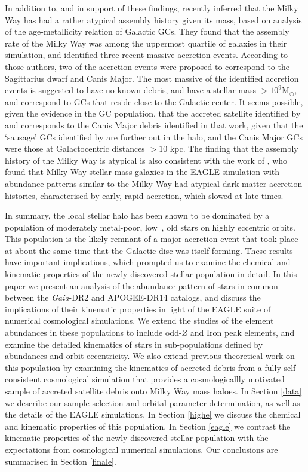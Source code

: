 In addition to, and in support of these findings,
\citet{2018MNRAS.tmp.1537K} recently inferred that the Milky Way
has had a rather atypical assembly history given its mass, based on analysis of 
the age-metallicity relation of Galactic GCs. They found that the
assembly rate of the Milky Way was among the uppermost quartile of
galaxies in their simulation, and identified three recent massive accretion events. According to those authors, two of the accretion events were proposed to correspond to the Sagittarius
dwarf and  Canis Major. The most
massive of the identified accretion events is suggested to have no
known debris, and have a stellar mass $> 10^9 \mathrm{M_\odot}$,
and correspond to GCs that reside close to the Galactic center. It
seems possible, given the evidence in the GC population, that the
accreted satellite identified by \citet{2018MNRAS.478..611B} and
\citet{2018ApJ...860L..11K} corresponds to the Canis Major debris
identified in that work, given that the `sausage' GCs identified
by \citet{2018arXiv180500453M} are further out in the halo, and the
Canis Major GCs were those at Galactocentric distances $> 10$ kpc.
The finding that the assembly history of the Milky Way is atypical
is also consistent with the work of \citet{2018MNRAS.477.5072M},
who found that Milky Way stellar mass galaxies in the EAGLE simulation
with \afe{} abundance patterns similar to the Milky Way had atypical
dark matter accretion histories, characterised by early, rapid
accretion, which slowed at late times.

In summary, the local stellar halo has been shown to be dominated
by a population of moderately metal-poor, low~\afe{}, old stars on
highly eccentric orbits.  This population is the likely remnant of
a major accretion event that took place at about the same time that
the Galactic disc was itself forming.  These results have important
implications, which prompted us to examine the chemical and kinematic
properties of the newly discovered stellar population in detail.
In this paper we present an analysis of the
 abundance pattern of stars in common between the \emph{Gaia}-DR2
and APOGEE-DR14 catalogs, and discuss the implications of their
kinematic properties in light of the  EAGLE suite of numerical
cosmological simulations. We extend the studies of the element abundances in these populations to include odd-$Z$ and Iron peak elements, and examine the detailed kinematics of stars in sub-populations defined by abundances and orbit eccentricity. We also extend previous theoretical work on this population by examining the kinematics of accreted debris from a fully self-consistent cosmological simulation that provides a cosmologicallly motivated sample of accreted satellite debris onto Milky Way mass haloes.  In Section \ref{data} we describe our
sample selection and orbital parameter determination, as well as
the details of the EAGLE simulations.  In Section \ref{highe} we
discuss the chemical and kinematic properties of this population.
In Section \ref{eagle} we contrast the kinematic properties of the
newly discovered stellar population with the expectations from
cosmological numerical simulations.  Our conclusions are summarised
in Section \ref{finale}.


